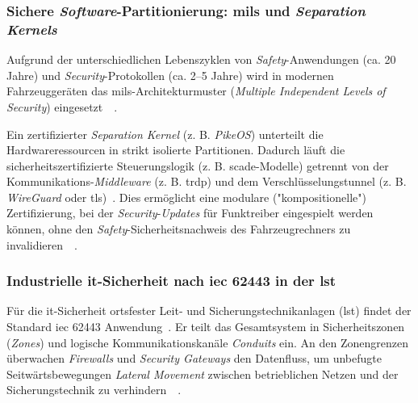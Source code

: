 \documentclass[runningheads]{res/llncs}
\begin{document}
\subsubsection{\texorpdfstring{Sichere \textit{Software}-Partitionierung: \gls{mils} und \textit{Separation Kernels}}{Sichere Software-Partitionierung: MILS und Separation Kernels}}
\label{sec:Sichere_Software-Partitionierung_MILS_und_Separation_Kernels}
Aufgrund der unterschiedlichen Lebenszyklen von \textit{Safety}-Anwendungen (ca. 20 Jahre) und \textit{Security}-Protokollen (ca. 2--5 Jahre) wird in modernen Fahrzeuggeräten das \gls{mils}-Architekturmuster (\textit{Multiple Independent Levels of Security}) eingesetzt~\parencite[S. 31--32]{schulzIntegration2019}~\parencite[S. 80--81]{tverdyshevCertMILS2019}. 

Ein zertifizierter \textit{Separation Kernel} (z. B. \textit{PikeOS}) unterteilt die Hardwareressourcen in strikt isolierte Partitionen. Dadurch läuft die sicherheitszertifizierte Steuerungslogik (z. B. \gls{scade}-Modelle) getrennt von der Kommunikations-\textit{Middleware} (z. B. \gls{trdp}) und dem Verschlüsselungstunnel (z. B. \textit{WireGuard} oder \gls{tls})~\parencite[S. 32--34]{schulzIntegration2019}. Dies ermöglicht eine modulare ("kompositionelle") Zertifizierung, bei der \textit{Security}-\textit{Updates} für Funktreiber eingespielt werden können, ohne den \textit{Safety}-Sicherheitsnachweis des Fahrzeugrechners zu invalidieren~\parencite[S. 31, 35]{schulzIntegration2019}~\parencite[S. 83]{tverdyshevCertMILS2019}.

\subsubsection{\texorpdfstring{Industrielle \gls{it}-Sicherheit nach \gls{iec} 62443 in der \gls{lst}}{Industrielle IT-Sicherheit nach IEC 62443 in der LST}}
\label{sec:Industrielle_IT-Sicherheit_nach_IEC_62443_in_der_LST}
Für die \gls{it}-Sicherheit ortsfester Leit- und Sicherungstechnikanlagen (\gls{lst}) findet der Standard \gls{iec} 62443 Anwendung~\parencite[S. 31, 33]{schulzIntegration2019}.
Er teilt das Gesamtsystem in Sicherheitszonen (\textit{Zones}) und logische Kommunikationskanäle \textit{Conduits} ein. An den Zonengrenzen überwachen \textit{Firewalls} und \textit{Security Gateways} den Datenfluss, um unbefugte Seitwärtsbewegungen \textit{Lateral Movement} zwischen betrieblichen Netzen und der Sicherungstechnik zu verhindern~\parencite[S. 33]{schulzIntegration2019}~\parencite[S. 43]{h.tsukisawaStandardization2024}. %
\end{document}

